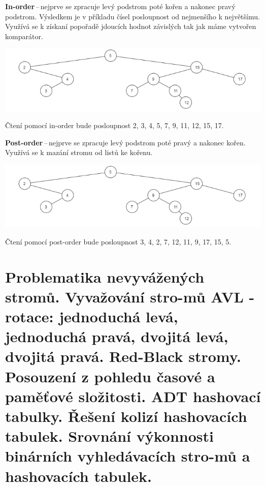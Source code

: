 \textbf{In-order}\,--\,nejprve se zpracuje levý podstrom poté kořen a nakonec pravý podstrom. Výsledkem je v příkladu čísel posloupnost od nejmenšího k největšímu. Využívá se k získaní popořadě jdoucích hodnot závislých tak jak máme vytvořen komparátor.
\begin{center}
\includegraphics[scale=1]{BPC-TIN/images/tree.PNG}
\end{center}
Čtení pomocí in-order bude posloupnost 2, 3, 4, 5, 7, 9, 11, 12, 15, 17.

\textbf{Post-order}\,--\,nejprve se zpracuje levý podstrom poté pravý a nakonec kořen. Využívá se k mazání stromu od listů ke kořenu.
\begin{center}
\includegraphics[scale=1]{BPC-TIN/images/tree.PNG}
\end{center}
Čtení pomocí post-order bude posloupnost 3, 4, 2, 7, 12, 11, 9, 17, 15, 5.














\newpage
\section[Problematika nevyvážených stromů. Vyvažování stromů AVL - rotace: jednoduchá levá, jednoduchá pravá, dvojitá levá, dvojitá pravá. Red-Black stromy. Posouzení z pohledu časové a paměťové složitosti. ADT hashovací tabulky. Řešení kolizí hashovacích tabulek. Srovnání výkonnosti binárních vyhledávacích stromů a hashovacích tabulek.]{Problematika nevyvážených stromů. Vyvažování stro-mů AVL - rotace: jednoduchá levá, jednoduchá pravá, dvojitá levá, dvojitá pravá. Red-Black stromy. Posouzení z pohledu časové a paměťové složitosti. ADT hashovací tabulky. Řešení kolizí hashovacích tabulek. Srovnání výkonnosti binárních vyhledávacích stro-mů a hashovacích tabulek.}

